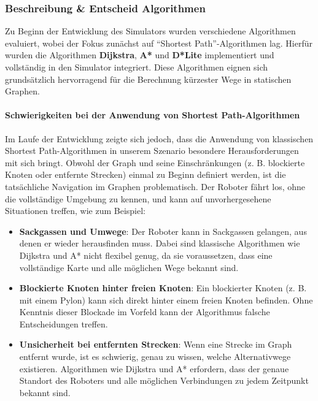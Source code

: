 \documentclass[main.tex]{subfiles} %
\begin{document}
\subsubsection{Beschreibung \& Entscheid Algorithmen}

Zu Beginn der Entwicklung des Simulators wurden verschiedene
Algorithmen evaluiert, wobei der Fokus zunächst auf \enquote{Shortest
Path}-Algorithmen lag. Hierfür wurden die Algorithmen
\textbf{Dijkstra}, \textbf{A*} und \textbf{D*Lite} implementiert und
vollständig in den Simulator integriert. Diese Algorithmen eignen
sich grundsätzlich hervorragend für die Berechnung kürzester Wege in
statischen Graphen.

\paragraph{Schwierigkeiten bei der Anwendung von Shortest Path-Algorithmen}

Im Laufe der Entwicklung zeigte sich jedoch, dass die Anwendung von
klassischen Shortest Path-Algorithmen in unserem Szenario besondere
Herausforderungen mit sich bringt. Obwohl der Graph und seine
Einschränkungen (z. B. blockierte Knoten oder entfernte Strecken)
einmal zu Beginn definiert werden, ist die tatsächliche Navigation im
Graphen problematisch. Der Roboter fährt los, ohne die vollständige
Umgebung zu kennen, und kann auf unvorhergesehene Situationen
treffen, wie zum Beispiel:

\begin{itemize}
  \item \textbf{Sackgassen und Umwege}:
    Der Roboter kann in Sackgassen gelangen, aus denen er wieder
    herausfinden muss. Dabei sind klassische Algorithmen wie Dijkstra
    und A* nicht flexibel genug, da sie voraussetzen, dass eine
    vollständige Karte und alle möglichen Wege bekannt sind.

  \item \textbf{Blockierte Knoten hinter freien Knoten}:
    Ein blockierter Knoten (z. B. mit einem Pylon) kann sich direkt
    hinter einem freien Knoten befinden. Ohne Kenntnis dieser
    Blockade im Vorfeld kann der Algorithmus falsche Entscheidungen treffen.

  \item \textbf{Unsicherheit bei entfernten Strecken}:
    Wenn eine Strecke im Graph entfernt wurde, ist es schwierig,
    genau zu wissen, welche Alternativwege existieren. Algorithmen
    wie Dijkstra und A* erfordern, dass der genaue Standort des
    Roboters und alle möglichen Verbindungen zu jedem Zeitpunkt bekannt sind.
\end{itemize}
\end{document}
